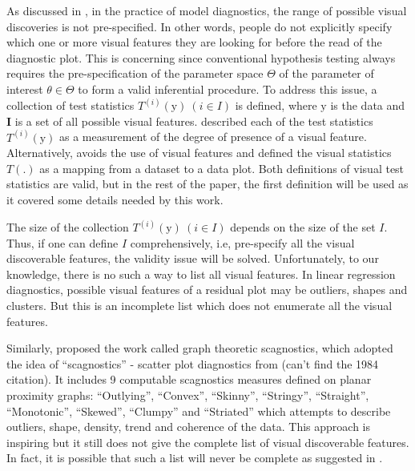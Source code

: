 \documentclass{monashthesis}
\begin{document}
As discussed in \textcite{buja_statistical_2009}, in the practice of model diagnostics, the range of possible visual discoveries is not pre-specified. In other words, people do not explicitly specify which one or more visual features they are looking for before the read of the diagnostic plot. This is concerning since conventional hypothesis testing always requires the pre-specification of the parameter space \(\Theta\) of the parameter of interest \(\theta \in \Theta\) to form a valid inferential procedure. To address this issue, a collection of test statistics \(T^{(i)}(\boldsymbol{\mathrm{y}})~(i \in I)\) is defined, where \(\boldsymbol{\mathrm{y}}\) is the data and \(\boldsymbol{I}\) is a set of all possible visual features. \textcite{buja_statistical_2009} described each of the test statistics \(T^{(i)}(\boldsymbol{\mathrm{y}})\) as a measurement of the degree of presence of a visual feature. Alternatively, \textcite{majumder_validation_2013} avoids the use of visual features and defined the visual statistics \(T(.)\) as a mapping from a dataset to a data plot. Both definitions of visual test statistics are valid, but in the rest of the paper, the first definition will be used as it covered some details needed by this work.

The size of the collection \(T^{(i)}(\boldsymbol{\mathrm{y}})~(i \in I)\) depends on the size of the set \(I\). Thus, if one can define \(I\) comprehensively, i.e, pre-specify all the visual discoverable features, the validity issue will be solved. Unfortunately, to our knowledge, there is no such a way to list all visual features. In linear regression diagnostics, possible visual features of a residual plot may be outliers, shapes and clusters. But this is an incomplete list which does not enumerate all the visual features.

Similarly, \textcite{wilkinson_graph-theoretic_2005} proposed the work called graph theoretic scagnostics, which adopted the idea of ``scagnostics'' - scatter plot diagnostics from (can't find the 1984 citation). It includes 9 computable scagnostics measures defined on planar proximity graphs: ``Outlying'', ``Convex'', ``Skinny'', ``Stringy'', ``Straight'', ``Monotonic'', ``Skewed'', ``Clumpy'' and ``Striated'' which attempts to describe outliers, shape, density, trend and coherence of the data. This approach is inspiring but it still does not give the complete list of visual discoverable features. In fact, it is possible that such a list will never be complete as suggested in \textcite{buja_statistical_2009}.
\end{document}
